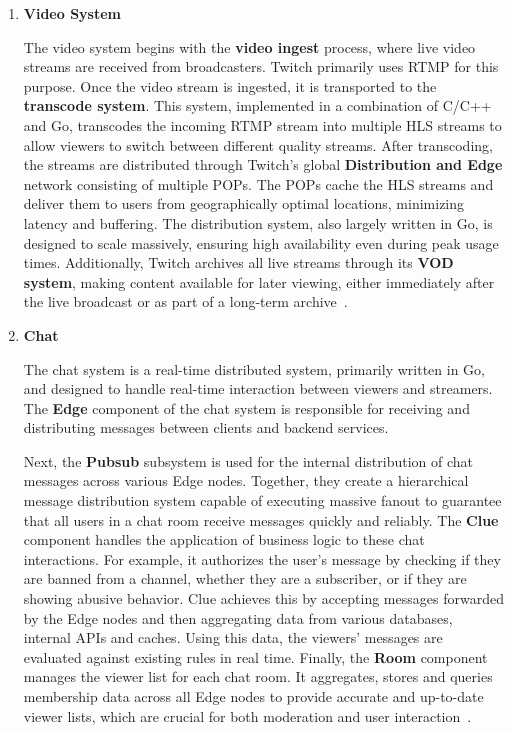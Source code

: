 \begin{enumerate}
    \item \textbf{Video System}
    
    The video system begins with the \textbf{video ingest} process, where live video streams are received from broadcasters. Twitch primarily uses \ac{RTMP} for this purpose. Once the video stream is ingested, it is transported to the \textbf{transcode system}. This system, implemented in a combination of C/C++ and Go, transcodes the incoming \ac{RTMP} stream into multiple \ac{HLS} streams to allow viewers to switch between different quality streams.
    After transcoding, the streams are distributed through Twitch's global \textbf{Distribution and Edge} network consisting of multiple \ac{POPs}. The \ac{POPs} cache the \ac{HLS} streams and deliver them to users from geographically optimal locations, minimizing latency and buffering. The distribution system, also largely written in Go, is designed to scale massively, ensuring high availability even during peak usage times. Additionally, Twitch archives all live streams through its \textbf{\ac{VOD} system}, making content available for later viewing, either immediately after the live broadcast or as part of a long-term archive~\parencite{twitch_engineering}.
    
    \item \textbf{Chat}

    The chat system is a real-time distributed system, primarily written in Go, and designed to handle real-time interaction between viewers and streamers. The \textbf{Edge} component of the chat system is responsible for receiving and distributing messages between clients and backend services.
    
    Next, the \textbf{Pubsub} subsystem is used for the internal distribution of chat messages across various Edge nodes. Together, they create a hierarchical message distribution system capable of executing massive fanout to guarantee that all users in a chat room receive messages quickly and reliably. The \textbf{Clue} component handles the application of business logic to these chat interactions. For example, it authorizes the user's message by checking if they are banned from a channel, whether they are a subscriber, or if they are showing abusive behavior. Clue achieves this by accepting messages forwarded by the Edge nodes and then aggregating data from various databases, internal \ac{API}s and caches. Using this data, the viewers' messages are evaluated against existing rules in real time. Finally, the \textbf{Room} component manages the viewer list for each chat room. It aggregates, stores and queries membership data across all Edge nodes to provide accurate and up-to-date viewer lists, which are crucial for both moderation and user interaction~\parencite{twitch_chat}.


\end{enumerate}
